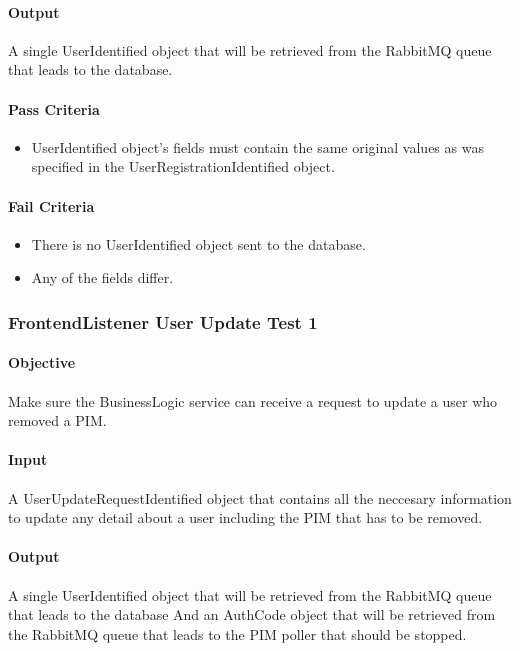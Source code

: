 \documentclass[hidelinks,english]{article}
\begin{document}
				\paragraph{Output} A single UserIdentified object that will be retrieved from the RabbitMQ queue that leads to the database.
				\paragraph{Pass Criteria}
				\begin{itemize}
					\item UserIdentified object's fields must contain the same original values as was specified in the UserRegistrationIdentified object.
				\end{itemize}
				\paragraph{Fail Criteria}
				\begin{itemize}
					\item There is no UserIdentified object sent to the database.
					\item Any of the fields differ.
				\end{itemize}
			
			\subsubsection{FrontendListener User Update Test 1}\label{businessfrontendlistenerupdatetest1}
				\paragraph{Objective} Make sure the BusinessLogic service can receive a request to update a user who removed a PIM.
				\paragraph{Input} A UserUpdateRequestIdentified object that contains all the neccesary information to update any detail about a user including the PIM that has to be removed.
				\paragraph{Output} A single UserIdentified object that will be retrieved from the RabbitMQ queue that leads to the database And an AuthCode object that  will be retrieved from the RabbitMQ queue that leads to the PIM poller that should be stopped.
\end{document}
